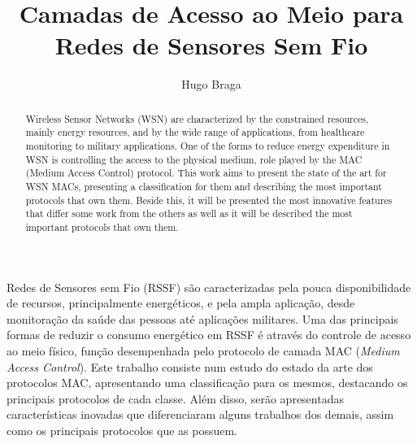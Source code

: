 \documentclass[12pt]{article}
\begin{document}




\def\CMAC{\mbox{C-MAC}}
\title{Camadas de Acesso ao Meio para Redes de Sensores Sem Fio}


\author{Hugo Braga}
%
\address{EASD - Especialização Avançada em Sistemas Distribuídos\\
LaSiD - Laboratório de Sistemas Distribuídos\\
DCC - Departamento de Ciência da Computação\\
UFBA - Universidade Federal da Bahia\\
Salvador, Bahia, Brasil\\
Email: {hugobraga@ufba.br}
}
\maketitle

\begin{abstract}
  Wireless Sensor Networks (WSN) are characterized by the constrained resources, mainly energy resources, and by the wide range of applications, from healthcare monitoring to 
military applications. One of the forms to reduce energy expenditure in WSN is controlling the access to the physical medium, role played by the MAC (Medium Access Control) protocol.
This work aims to present the state of the art for WSN MACs, presenting a classification for them and describing the most important protocols that own them. Beside this,
it will be presented the most innovative features that differ some work from the others as well as it will be described the most important protocols that own them.
\end{abstract}

\begin{resumo}
  Redes de Sensores sem Fio (RSSF) são caracterizadas pela pouca disponibilidade de recursos, principalmente energéticos, e pela ampla aplicação, desde monitoração da saúde
das pessoas até aplicações militares. Uma das principais formas de reduzir o consumo energético em RSSF é através do controle de acesso ao meio físico, função desempenhada pelo
protocolo de camada MAC (\emph{Medium Access Control}). Este trabalho consiste num estudo do estado da arte dos protocolos MAC, apresentando uma classificação para os mesmos, 
destacando os principais protocolos de cada classe. Além disso, serão apresentadas características inovadas que diferenciaram alguns trabalhos dos demais, assim como os 
principais protocolos que as possuem. 
\end{resumo}
\end{document}
